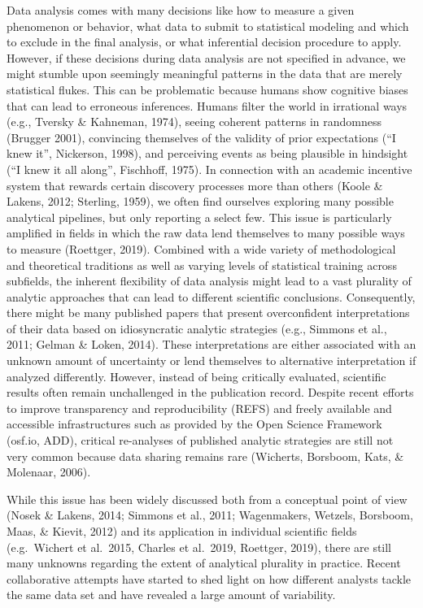 \documentclass[
  english,
  man,floatsintext]{apa6}
\begin{document}
Data analysis comes with many decisions like how to measure a given phenomenon or behavior, what data to submit to statistical modeling and which to exclude in the final analysis, or what inferential decision procedure to apply.
However, if these decisions during data analysis are not specified in advance, we might stumble upon seemingly meaningful patterns in the data that are merely statistical flukes.
This can be problematic because humans show cognitive biases that can lead to erroneous inferences.
Humans filter the world in irrational ways (e.g., Tversky \& Kahneman, 1974), seeing coherent patterns in randomness (Brugger 2001), convincing themselves of the validity of prior expectations (``I knew it'', Nickerson, 1998), and perceiving events as being plausible in hindsight (``I knew it all along'', Fischhoff, 1975).
In connection with an academic incentive system that rewards certain discovery processes more than others (Koole \& Lakens, 2012; Sterling, 1959), we often find ourselves exploring many possible analytical pipelines, but only reporting a select few.
This issue is particularly amplified in fields in which the raw data lend themselves to many possible ways to measure (Roettger, 2019).
Combined with a wide variety of methodological and theoretical traditions as well as varying levels of statistical training across subfields, the inherent flexibility of data analysis might lead to a vast plurality of analytic approaches that can lead to different scientific conclusions.
Consequently, there might be many published papers that present overconfident interpretations of their data based on idiosyncratic analytic strategies (e.g., Simmons et al., 2011; Gelman \& Loken, 2014).
These interpretations are either associated with an unknown amount of uncertainty or lend themselves to alternative interpretation if analyzed differently.
However, instead of being critically evaluated, scientific results often remain unchallenged in the publication record.
Despite recent efforts to improve transparency and reproducibility (REFS) and freely available and accessible infrastructures such as provided by the Open Science Framework (osf.io, ADD), critical re-analyses of published analytic strategies are still not very common because data sharing remains rare (Wicherts, Borsboom, Kats, \& Molenaar, 2006).

While this issue has been widely discussed both from a conceptual point of view (Nosek \& Lakens, 2014; Simmons et al., 2011; Wagenmakers, Wetzels, Borsboom, Maas, \& Kievit, 2012) and its application in individual scientific fields (e.g.~Wichert et al.~2015, Charles et al.~2019, Roettger, 2019), there are still many unknowns regarding the extent of analytical plurality in practice.
Recent collaborative attempts have started to shed light on how different analysts tackle the same data set and have revealed a large amount of variability.
\end{document}
